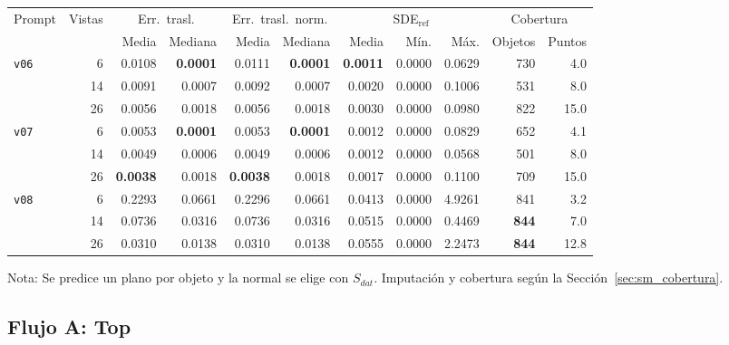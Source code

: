 \begin{table}[H]
\vspace{2ex}

\begin{tabular*}{\textwidth}{@{\extracolsep{\fill}}lrrrrrrrrrr@{}}
\toprule
\multirow{2}{*}{Prompt} & \multirow{2}{*}{Vistas} & \multicolumn{2}{c}{Err.\ trasl.} & \multicolumn{2}{c}{Err.\ trasl.\ norm.} & \multicolumn{3}{c}{SDE$_{\mathrm{ref}}$} & \multicolumn{2}{c}{Cobertura} \\
\cmidrule(lr){3-4} \cmidrule(lr){5-6} \cmidrule(lr){7-9} \cmidrule(lr){10-11}
 &  & Media & Mediana & Media & Mediana & Media & Mín. & Máx. & Objetos & Puntos \\
\midrule
\multirow{3}{*}{\texttt{v06}} & 6 & 0.0108 & \textbf{0.0001} & 0.0111 & \textbf{0.0001} & \textbf{0.0011} & 0.0000 & 0.0629 & 730 & 4.0 \\
 & 14 & 0.0091 & 0.0007 & 0.0092 & 0.0007 & 0.0020 & 0.0000 & 0.1006 & 531 & 8.0 \\
 & 26 & 0.0056 & 0.0018 & 0.0056 & 0.0018 & 0.0030 & 0.0000 & 0.0980 & 822 & 15.0 \\
\midrule
\multirow{3}{*}{\texttt{v07}} & 6 & 0.0053 & \textbf{0.0001} & 0.0053 & \textbf{0.0001} & 0.0012 & 0.0000 & 0.0829 & 652 & 4.1 \\
 & 14 & 0.0049 & 0.0006 & 0.0049 & 0.0006 & 0.0012 & 0.0000 & 0.0568 & 501 & 8.0 \\
 & 26 & \textbf{0.0038} & 0.0018 & \textbf{0.0038} & 0.0018 & 0.0017 & 0.0000 & 0.1100 & 709 & 15.0 \\
\midrule
\multirow{3}{*}{\texttt{v08}} & 6 & 0.2293 & 0.0661 & 0.2296 & 0.0661 & 0.0413 & 0.0000 & 4.9261 & 841 & 3.2 \\
 & 14 & 0.0736 & 0.0316 & 0.0736 & 0.0316 & 0.0515 & 0.0000 & 0.4469 & \textbf{844} & 7.0 \\
 & 26 & 0.0310 & 0.0138 & 0.0310 & 0.0138 & 0.0555 & 0.0000 & 2.2473 & \textbf{844} & 12.8 \\
\bottomrule
\end{tabular*}

\vspace{1.5ex}
\begin{minipage}{\textwidth}
Nota: Se predice un plano por objeto y la normal se elige con $S_{dat}$. Imputación y cobertura según la Sección~\ref{sec:sm_cobertura}.
\end{minipage}
\end{table}





\newpage
\subsection{Flujo A: Top}
\label{subsec:plane_top_224}

